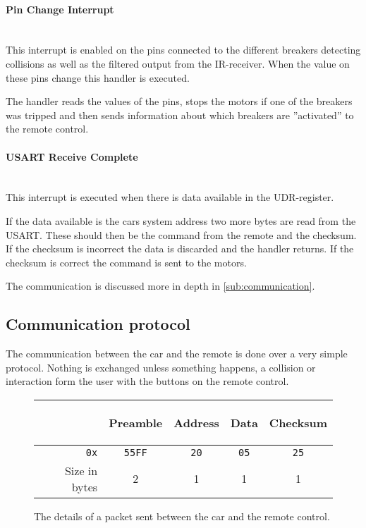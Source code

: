 \documentclass[a4paper,twoside,titlepage]{article}
\begin{document}
\paragraph{Pin Change Interrupt} %
\label{par:pc_int}
~\\
This interrupt is enabled on the pins connected to the different breakers detecting collisions as well as the filtered output from the IR-receiver. When the value on these pins change this handler is executed.

The handler reads the values of the pins, stops the motors if one of the breakers was tripped and then sends information about which breakers are ''activated'' to the remote control.

\paragraph{USART Receive Complete} %
\label{par:rc_int}
~\\
This interrupt is executed when there is data available in the UDR-register.

If the data available is the cars system address two more bytes are read from the USART. These should then be the command from the remote and the checksum. If the checksum is incorrect the data is discarded and the handler returns. If the checksum is correct the command is sent to the motors.

The communication is discussed more in depth in \autoref{sub:communication}.

\subsection{Communication protocol} %
\label{sub:communication}

The communication between the car and the remote is done over a very simple protocol. Nothing is exchanged unless something happens, a collision or interaction form the user with the buttons on the remote control.

\begin{figure}[h]
   \caption{The details of a packet sent between the car and the remote control.}
   \label{tab:protocol}
   \vspace{12mm}
   \centering
      \begin{tabular}{rcccc}
         &\begin{rotate}{45}Preamble\end{rotate} & \begin{rotate}{45}Address\end{rotate} & \begin{rotate}{45}Data\end{rotate} & \begin{rotate}{45}Checksum\end{rotate} \\
         \hline
         {\tt 0x} & {\tt 55FF} & {\tt 20} & {\tt 05} & {\tt 25}\\
         \hline
         Size in bytes & 2 & 1 & 1 & 1
      \end{tabular}
\end{figure}
\end{document}
